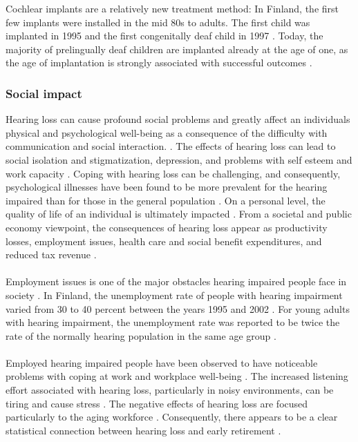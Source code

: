\documentclass[english, 12pt, a4paper, pdftex, elec, utf8]{aaltothesis}
\begin{document}
Cochlear implants are a relatively new treatment method: In Finland, the first few implants were installed in the mid 80s to adults. The first child was implanted in 1995 and the first congenitally deaf child in 1997 \cite{raino2012sisakorvaistutteen}. Today, the majority of prelingually deaf children are implanted already at the age of one, as the age of implantation is strongly associated with successful outcomes \cite{peterson2010cochlear, stacey2006hearing, raino2012sisakorvaistutteen}.

\subsubsection{Social impact}

Hearing loss can cause profound social problems and greatly affect an individuals physical and psychological well-being as a consequence of the difficulty with communication and social interaction. \cite{wilson2017global, koskela2013kuulokojeen}. The effects of hearing loss can lead to social isolation and stigmatization, depression, and problems with self esteem and work capacity \cite{wilson2017global, koskela2013kuulokojeen, lavikainen2014}. Coping with hearing loss can be challenging, and consequently, psychological illnesses have been found to be more prevalent for the hearing impaired than for those in the general population \cite{wilson2017global}. On a personal level, the quality of life of an individual is ultimately impacted \cite{blomberg2012sisakorvaistutetta}. From a societal and public economy viewpoint, the consequences of hearing loss appear as productivity losses, employment issues, health care and social benefit expenditures, and reduced tax revenue  \cite{wilson2017global}. \\\\
Employment issues is one of the major obstacles hearing impaired people face in society \cite{hietala2008huonokuuloinen}. In Finland, the unemployment rate of people with hearing impairment varied from 30 to 40 percent between the years 1995 and 2002 \cite{hietala2008huonokuuloinen}. For young adults with hearing impairment, the unemployment rate was reported to be twice the rate of the normally hearing population in the same age group \cite{hietala2008huonokuuloinen}. \\\\
Employed hearing impaired people have been observed to have noticeable problems with coping at work and workplace well-being \cite{wilson2017global, hietala2008huonokuuloinen}. The increased listening effort associated with hearing loss, particularly in noisy environments, can be tiring and cause stress \cite{ohlenforst2017effects, koskela2013kuulokojeen}. The negative effects of hearing loss are focused particularly to the aging workforce \cite{koskela2013kuulokojeen}. Consequently, there appears to be a clear statistical connection between hearing loss and early retirement \cite{hietala2008huonokuuloinen}.
\end{document}
